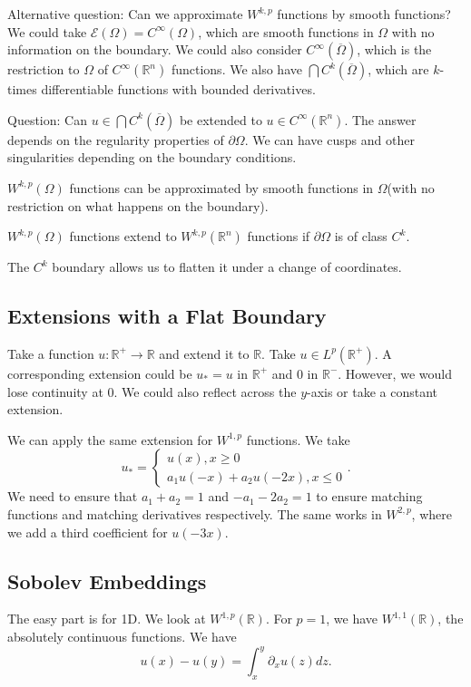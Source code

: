 \documentclass[11pt]{scrartcl}
\newcommand{\R}{\mathbb{R}}
\let \mc \mathcal
\begin{document}
Alternative question: Can we approximate $W^{k, p}$ functions by smooth functions?  We could take $\mc E(\Omega) = C^{\infty}(\Omega)$, which are smooth functions in $\Omega$ with no information on the boundary.  We could also consider $C^{\infty}(\overline{\Omega})$, which is the restriction to $\Omega$ of $C^\infty(\R^n)$ functions.  We also have $\bigcap C^k(\overline{\Omega})$, which are $k$-times differentiable functions with bounded derivatives.  

Question:  Can $u \in \bigcap C^k(\overline{\Omega})$ be extended to $u \in C^{\infty}(\R^n)$.  The answer depends on the regularity properties of $\partial \Omega$.  We can have cusps and other singularities depending on the boundary conditions.

\begin{proposition} $W^{k, p}(\Omega)$ functions can be approximated by smooth functions in $\Omega$(with no restriction on what happens on the boundary).
\end{proposition}
\begin{proposition} $W^{k, p}(\Omega)$ functions extend to $W^{k, p}(\R^n)$ functions if $\partial \Omega$ is of class $C^k$.
\end{proposition}
The $C^k$ boundary allows us to flatten it under a change of coordinates.

\subsection{Extensions with a Flat Boundary}
Take a function $u: \R^+ \to \R$ and extend it to $\R$.  Take $u \in L^p(\R^+)$.  A corresponding extension could be $u_* = u$ in $\R^+$ and $0$ in $\R^-$.  However, we would lose continuity at $0$.  We could also reflect across the $y$-axis or take a constant extension.  

We can apply the same extension for $W^{1, p}$ functions. We take 
$$u_* = \begin{cases}
u(x), x \ge 0 \\
a_1 u(-x) + a_2 u(-2x), x \le 0
\end{cases}.
$$
We need to ensure that $a_1 + a_2 = 1$ and $-a_1 - 2a_2 = 1$ to ensure matching functions and matching derivatives respectively.  The same works in $W^{2, p}$, where we add a third coefficient for $u(-3x)$.

\subsection{Sobolev Embeddings}
The easy part is for 1D.  We look at $W^{1, p}(\R)$.   For $p= 1$, we have $W^{1, 1}(\R)$, the absolutely continuous functions.  We have 
$$u(x) - u(y) = \int_{x}^y \partial_x u(z)dz.$$
\end{document}
